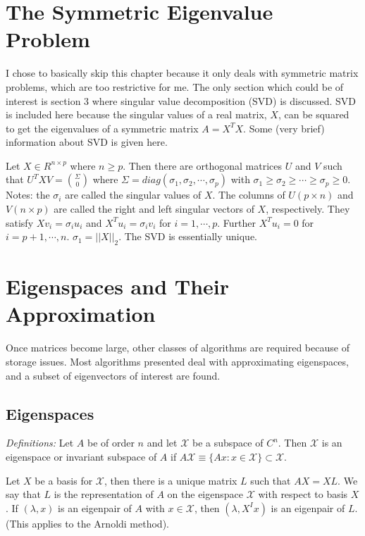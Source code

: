 \documentclass[12pt,twoside]{article}
\newcommand{\evals}{eigenvalues }
\newcommand{\evecs}{eigenvectors }
\begin{document}
\section{The Symmetric Eigenvalue Problem}
I chose to basically skip this chapter because it only deals with symmetric matrix problems, which are too restrictive for me. The only section which could be of interest is section 3 where singular value decomposition (SVD) is discussed. SVD is included here because the singular values of a real matrix, $X$, can be squared to get the \evals of a symmetric matrix $A = X^{T}X$. Some (very brief) information about SVD is given here.

Let $X \in R^{n \times p}$ where $n \ge p$. Then there are orthogonal matrices $U$ and $V$ such that $U^{T}XV = \binom{\Sigma}{0}$ where $\Sigma = diag(\sigma_{1}, \sigma_{2}, \cdots, \sigma_{p})$ with $\sigma_{1} \ge \sigma_{2} \ge \cdots \ge \sigma_{p} \ge 0$. Notes: the $\sigma_{i}$ are called the singular values of $X$. The columns of $U(p \times n)$ and $V(n \times p)$ are called the right and left singular vectors of $X$, respectively. They satisfy $Xv_{i} = \sigma_{i}u_{i}$ and $X^{T}u_{i} = \sigma_{i}v_{i}$ for $i = 1, \cdots, p$. Further $X^{T}u_{i}=0$ for $i = p+1, \cdots, n$. $\sigma_{1} = ||X||_{2}$. The SVD is essentially unique. 

\section{Eigenspaces and Their Approximation}
Once matrices become large, other classes of algorithms are required because of storage issues. Most algorithms presented deal with approximating eigenspaces, and a subset of \evecs of interest are found. 

\subsection{Eigenspaces}
\emph{Definitions:} Let $A$ be of order $n$ and let $\mathcal{X}$ be a subspace of $C^n$. Then $\mathcal{X}$ is an eigenspace or invariant subspace of $A$ if $A\mathcal{X} \equiv \{Ax: x\in \mathcal{X}\} \subset \mathcal{X}$. 

Let $X$ be a basis for $\mathcal{X}$, then there is a unique matrix $L$ such that $AX = XL$. We say that $L$ is the representation of $A$ on the eigenspace $\mathcal{X}$ with respect to basis $X$. If $(\lambda,x)$ is an eigenpair of $A$ with $x \in \mathcal{X}$, then $(\lambda, X^Ix)$ is an eigenpair of $L$. (This applies to the Arnoldi method). 
\end{document}

